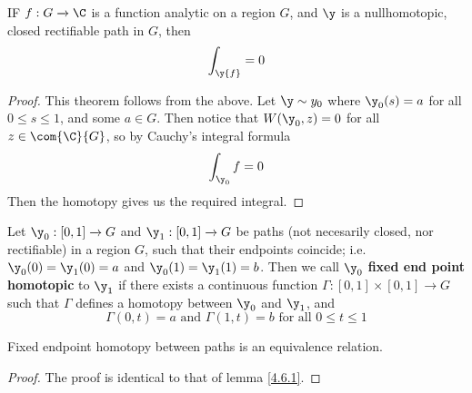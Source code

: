 \begin{theorem}\label{4.6.4}
    IF $f:G \xrightarrow{} \C$ is a function analytic on a region $G$, and  $\y$
    is a nullhomotopic, closed rectifiable path in $G$, then
    \begin{equation*}
        \int_\y{f}=0
    \end{equation*}
\end{theorem}
\begin{proof}
    This theorem follows from the above. Let $\y \sim y_0$ where $\y_0(s)=a$ for
    all $0 \leq s \leq 1$, and some  $a \in G$. Then notice that  $W(\y_0,z)=0$
    for all $z \in \com{\C}{G}$, so by Cauchy's integral formula
    \begin{equation*}
        \int_{\y_0}{f}=0
    \end{equation*}
    Then the homotopy gives us the required integral.
\end{proof}

\begin{definition}
    Let $\y_0:[0,1] \xrightarrow{} G$ and $\y_1:[0,1] \xrightarrow{} G$ be
    paths (not necesarily closed, nor rectifiable) in a region $G$, such that
    their endpoints coincide; i.e.  $\y_0(0)=\y_1(0)=a$ and $\y_0(1)=\y_1(1)=b$.
    Then we call $\y_0$ \textbf{fixed end point homotopic} to $\y_1$ if there
    exists a continuous function $\Gamma:[0,1] \times [0,1] \xrightarrow{} G$
    such that $\Gamma$ defines a homotopy between  $\y_0$ and $\y_1$, and
    \begin{equation*}
        \Gamma(0,t)=a \text{ and } \Gamma(1,t)=b \text{ for all } 0 \leq t \leq
        1
    \end{equation*}
\end{definition}

\begin{lemma}\label{4.6.5}
    Fixed endpoint homotopy between paths is an equivalence relation.
\end{lemma}
\begin{proof}
    The proof is identical to that of lemma \ref{4.6.1}.
\end{proof}


